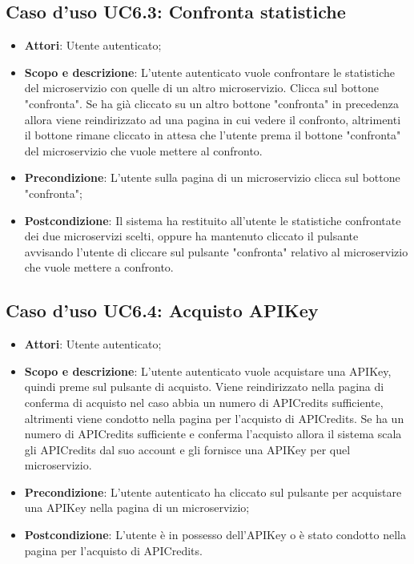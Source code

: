 \documentclass[12pt,a4paper,titlepage]{article}
\begin{document}
	\subsection{Caso d'uso UC6.3: Confronta statistiche}
	\label{UC6.3}
	\begin{itemize}
		\item \textbf{Attori}: Utente autenticato;
		\item \textbf{Scopo e descrizione}: L'utente autenticato vuole confrontare le statistiche del microservizio con quelle di un altro microservizio. Clicca sul bottone "confronta". Se ha già cliccato su un altro bottone "confronta" in precedenza allora viene reindirizzato ad una pagina in cui vedere il confronto, altrimenti il bottone rimane cliccato in attesa che l'utente prema il bottone "confronta" del microservizio che vuole mettere al confronto.
		\item \textbf{Precondizione}: L'utente sulla pagina di un microservizio clicca sul bottone "confronta";
		\item \textbf{Postcondizione}: Il sistema ha restituito all'utente le statistiche confrontate dei due microservizi scelti, oppure ha mantenuto cliccato il pulsante avvisando l'utente di cliccare sul pulsante "confronta" relativo al microservizio che vuole mettere a confronto.
	\end{itemize}

	\subsection{Caso d'uso UC6.4: Acquisto APIKey}
	\label{UC6.4}
	\begin{itemize}
		\item \textbf{Attori}: Utente autenticato;
		\item \textbf{Scopo e descrizione}: L'utente autenticato vuole acquistare una APIKey, quindi preme sul pulsante di acquisto. Viene reindirizzato nella pagina di conferma di acquisto nel caso abbia un numero di APICredits sufficiente, altrimenti viene condotto nella pagina per l'acquisto di APICredits. Se ha un numero di APICredits sufficiente e conferma l'acquisto allora il sistema scala gli APICredits dal suo account e gli fornisce una APIKey per quel microservizio.
		\item \textbf{Precondizione}: L'utente autenticato ha cliccato sul pulsante per acquistare una APIKey nella pagina di un microservizio;
		\item \textbf{Postcondizione}: L'utente è in possesso dell'APIKey o è stato condotto nella pagina per l'acquisto di APICredits.
	\end{itemize}
\end{document}
